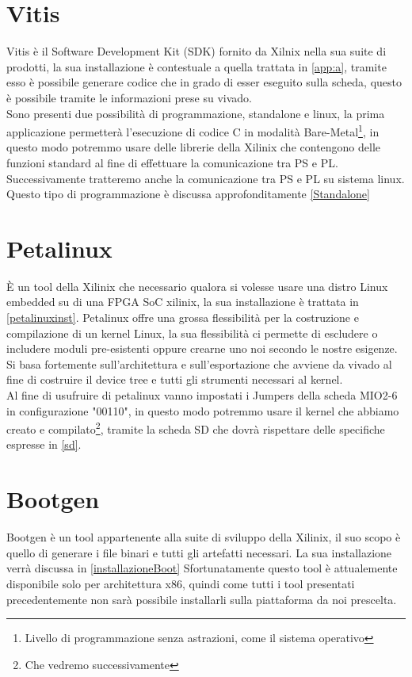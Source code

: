 \section{Vitis}
Vitis è il Software Development Kit (SDK) fornito da Xilnix nella sua suite di prodotti, la sua installazione è contestuale a quella trattata in \ref{app:a}, tramite esso è possibile generare codice che in grado di esser eseguito sulla scheda, questo è possibile tramite le informazioni prese su vivado.\\
Sono presenti due possibilità di programmazione, standalone e linux, la prima applicazione permetterà l'esecuzione di codice C in modalità Bare-Metal\footnote{Livello di programmazione senza astrazioni, come il sistema operativo}, in questo modo potremmo usare delle librerie della Xilinix che contengono delle funzioni standard al fine di effettuare la comunicazione tra PS e PL. Successivamente tratteremo anche la comunicazione tra PS e PL su sistema linux. Questo tipo di programmazione è discussa approfonditamente \ref{Standalone}
\section{Petalinux}
È un tool della Xilinix che necessario qualora si volesse usare una distro Linux embedded su di una FPGA SoC xilinix, la sua installazione è trattata in \ref{petalinuxinst}. Petalinux offre una grossa flessibilità per la costruzione e compilazione di un kernel Linux, la sua flessibilità ci permette di escludere o includere moduli pre-esistenti oppure crearne uno noi secondo le nostre esigenze. Si basa fortemente sull'architettura e sull'esportazione che avviene da vivado al fine di costruire il device tree e tutti gli strumenti necessari al kernel.\\
Al fine di usufruire di petalinux vanno impostati i Jumpers della scheda MIO2-6 in configurazione  "00110", in questo modo potremmo usare il kernel che abbiamo creato e compilato\footnote{Che vedremo successivamente}, tramite la scheda SD che dovrà rispettare delle specifiche espresse in \ref{sd}.
\section{Bootgen}
Bootgen è un tool appartenente alla suite di sviluppo della Xilinix, il suo scopo è quello di generare i file binari e tutti gli artefatti necessari. La sua installazione verrà discussa in \ref{installazioneBoot}
Sfortunatamente questo tool è attualemente disponibile solo per architettura x86, quindi come tutti i tool presentati precedentemente non sarà possibile installarli sulla piattaforma da noi prescelta.\\